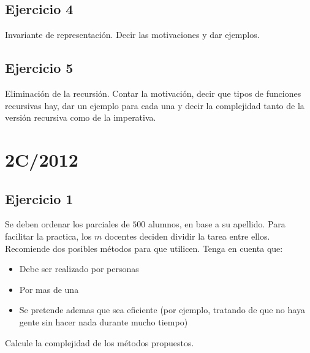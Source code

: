 \documentclass[10pt, a4paper]{article}
\begin{document}
\subsection*{Ejercicio 4}
Invariante de representaci\'on. Decir las motivaciones y dar ejemplos.

\subsection*{Ejercicio 5}
Eliminaci\'on de la recursi\'on. Contar la motivaci\'on, decir que tipos de funciones recursivas hay, dar un ejemplo para cada una y decir la complejidad tanto de la versi\'on recursiva como de la imperativa.

\newpage
\section{2C/2012}

\subsection*{Ejercicio 1}

Se deben ordenar los parciales de $500$ alumnos, en base a su apellido. Para facilitar la practica, los $m$ docentes deciden dividir la tarea entre ellos. Recomiende dos posibles m\'etodos para que utilicen. Tenga en cuenta que:
\begin{itemize}
 \item Debe ser realizado por personas
 \item Por mas de una
 \item Se pretende ademas que sea eficiente (por ejemplo, tratando de que no haya gente sin hacer nada durante mucho tiempo)
\end{itemize}

Calcule la complejidad de los m\'etodos propuestos.
\end{document}
